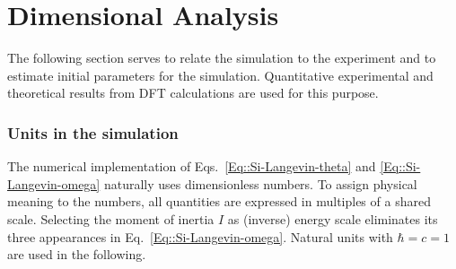 	\section{Dimensional Analysis} \label{Section::quantitative}
	The following section serves to relate the simulation to the experiment and to estimate initial parameters for the simulation. Quantitative experimental and theoretical results from DFT calculations are used for this purpose.
	\subsubsection{Units in the simulation}
	The numerical implementation of Eqs.~\eqref{Eq::Si-Langevin-theta} and \eqref{Eq::Si-Langevin-omega} naturally uses dimensionless numbers. To assign physical meaning to the numbers, all quantities are expressed in multiples of a shared scale. Selecting the moment of inertia $I$ as (inverse) energy scale eliminates its three appearances in Eq.~\eqref{Eq::Si-Langevin-omega}. Natural units with $\hbar =	c =	1$ are used in the following. \\
	
